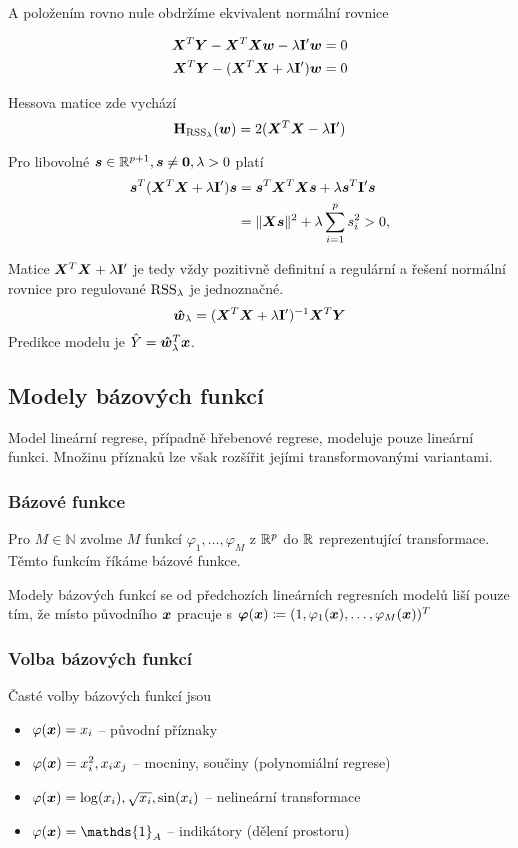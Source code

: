 \documentclass[../main.tex]{subfiles}
\begin{document}
A položením rovno nule obdržíme ekvivalent normální rovnice

\begin{align*}
    \bm{X}^T\bm{Y} - \bm{X}^T\bm{X}\bm{w} - \lambda \mathbf{I}' \bm{w} & = 0 \\
    \bm{X}^T\bm{Y} - (\bm{X}^T\bm{X} + \lambda \mathbf{I}') \bm{w}  & = 0
\end{align*}

Hessova matice zde vychází
\[
    \textbf{H}_{\operatorname{RSS}_\lambda}(\bm{w}) = 2(\bm{X}^T\bm{X} - \lambda \mathbf{I}')
\]

Pro libovolné $\bm{s} \in \mathbb{R}^{p+1}, \bm{s} \ne \bm{0}, \lambda > 0$ platí
\begin{align*}
    \bm{s}^T(\bm{X}^T\bm{X} + \lambda \mathbf{I}')\bm{s}
     & = \bm{s}^T \bm{X}^T\bm{X} \bm{s} + \lambda \bm{s}^T \mathbf{I}' \bm{s} \\
     & = \| \bm{X} \bm{s} \|^2 + \lambda \sum_{i=1}^{p} s_i^2 > 0,
\end{align*}

Matice $\bm{X}^T\bm{X} + \lambda \mathbf{I}'$ je tedy vždy pozitivně definitní a regulární a řešení normální rovnice pro regulované $\operatorname{RSS}_\lambda$ je jednoznačné.
\[\bm{\hat{w}}_\lambda = (\bm{X}^T\bm{X} + \lambda \mathbf{I}')^{-1} \bm{X}^T\bm{Y}\]
Predikce modelu je $\hat{Y} = \bm{\hat{w}}_\lambda^T\bm{x}$.

\subsection{Modely bázových funkcí}

Model lineární regrese, případně hřebenové regrese, modeluje pouze lineární funkci. Množinu příznaků lze však rozšířit jejími transformovanými variantami.

\subsubsection{Bázové funkce}

Pro $M \in \mathbb{N}$ zvolme $M$ funkcí $\varphi_1, \ldots, \varphi_M$ z $\mathbb{R}^{p}$ do $\mathbb{R}$ reprezentující transformace. Těmto funkcím říkáme bázové funkce.

Modely bázových funkcí se od předchozích lineárních regresních modelů liší pouze tím, že místo původního $\bm{x}$ pracuje s $\bm{\varphi}(\bm{x})  \coloneqq (1, \varphi_1(\bm{x}), \ldots, \varphi_M(\bm{x}))^T$

\subsubsection{Volba bázových funkcí}

Časté volby bázových funkcí jsou
\begin{itemize}
    \item $\varphi(\bm{x}) = x_i$ -- původní příznaky
    \item $\varphi(\bm{x}) = x_i^2, x_i x_j$ -- mocniny, součiny (polynomiální regrese)
    \item $\varphi(\bm{x}) = \log(x_i), \sqrt{x_i}, \sin(x_i)$ -- nelineární transformace
    \item $\varphi(\x) = \mathds{1}_{A}$ -- indikátory (dělení prostoru)
\end{itemize}
\end{document}
